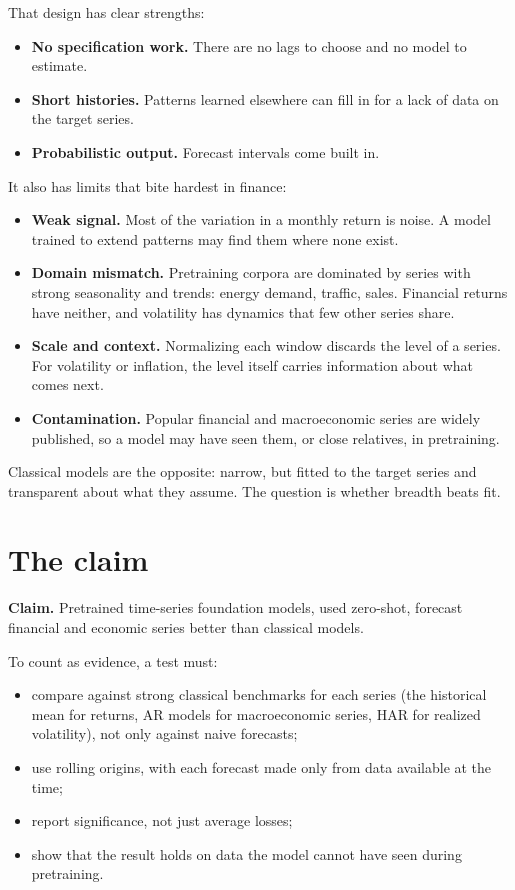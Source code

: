 That design has clear strengths:

\begin{itemize}
  \item \textbf{No specification work.} There are no lags to choose and no model to estimate.
  \item \textbf{Short histories.} Patterns learned elsewhere can fill in for a lack of data on the target series.
  \item \textbf{Probabilistic output.} Forecast intervals come built in.
\end{itemize}

It also has limits that bite hardest in finance:

\begin{itemize}
  \item \textbf{Weak signal.} Most of the variation in a monthly return is noise. A model trained to extend patterns may find them where none exist.
  \item \textbf{Domain mismatch.} Pretraining corpora are dominated by series with strong seasonality and trends: energy demand, traffic, sales. Financial returns have neither, and volatility has dynamics that few other series share.
  \item \textbf{Scale and context.} Normalizing each window discards the level of a series. For volatility or inflation, the level itself carries information about what comes next.
  \item \textbf{Contamination.} Popular financial and macroeconomic series are widely published, so a model may have seen them, or close relatives, in pretraining.
\end{itemize}

Classical models are the opposite: narrow, but fitted to the target series and transparent about what they assume. The question is whether breadth beats fit.

\section{The claim}
\label{sec:21-claim}

\begin{callout}
\textbf{Claim.} Pretrained time-series foundation models, used zero-shot, forecast financial and economic series better than classical models.
\end{callout}

To count as evidence, a test must:

\begin{itemize}
  \item compare against strong classical benchmarks for each series (the historical mean for returns, AR models for macroeconomic series, HAR for realized volatility), not only against naive forecasts;
  \item use rolling origins, with each forecast made only from data available at the time;
  \item report significance, not just average losses;
  \item show that the result holds on data the model cannot have seen during pretraining.
\end{itemize}

